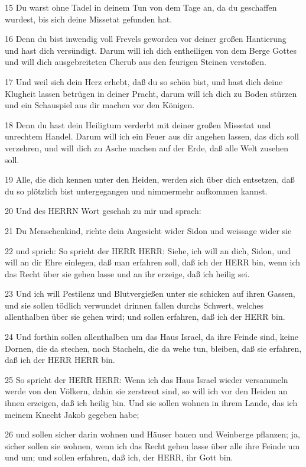 \par 15 Du warst ohne Tadel in deinem Tun von dem Tage an, da du geschaffen wurdest, bis sich deine Missetat gefunden hat.
\par 16 Denn du bist inwendig voll Frevels geworden vor deiner großen Hantierung und hast dich versündigt. Darum will ich dich entheiligen von dem Berge Gottes und will dich ausgebreiteten Cherub aus den feurigen Steinen verstoßen.
\par 17 Und weil sich dein Herz erhebt, daß du so schön bist, und hast dich deine Klugheit lassen betrügen in deiner Pracht, darum will ich dich zu Boden stürzen und ein Schauspiel aus dir machen vor den Königen.
\par 18 Denn du hast dein Heiligtum verderbt mit deiner großen Missetat und unrechtem Handel. Darum will ich ein Feuer aus dir angehen lassen, das dich soll verzehren, und will dich zu Asche machen auf der Erde, daß alle Welt zusehen soll.
\par 19 Alle, die dich kennen unter den Heiden, werden sich über dich entsetzen, daß du so plötzlich bist untergegangen und nimmermehr aufkommen kannst.
\par 20 Und des HERRN Wort geschah zu mir und sprach:
\par 21 Du Menschenkind, richte dein Angesicht wider Sidon und weissage wider sie
\par 22 und sprich: So spricht der HERR HERR: Siehe, ich will an dich, Sidon, und will an dir Ehre einlegen, daß man erfahren soll, daß ich der HERR bin, wenn ich das Recht über sie gehen lasse und an ihr erzeige, daß ich heilig sei.
\par 23 Und ich will Pestilenz und Blutvergießen unter sie schicken auf ihren Gassen, und sie sollen tödlich verwundet drinnen fallen durchs Schwert, welches allenthalben über sie gehen wird; und sollen erfahren, daß ich der HERR bin.
\par 24 Und forthin sollen allenthalben um das Haus Israel, da ihre Feinde sind, keine Dornen, die da stechen, noch Stacheln, die da wehe tun, bleiben, daß sie erfahren, daß ich der HERR HERR bin.
\par 25 So spricht der HERR HERR: Wenn ich das Haus Israel wieder versammeln werde von den Völkern, dahin sie zerstreut sind, so will ich vor den Heiden an ihnen erzeigen, daß ich heilig bin. Und sie sollen wohnen in ihrem Lande, das ich meinem Knecht Jakob gegeben habe;
\par 26 und sollen sicher darin wohnen und Häuser bauen und Weinberge pflanzen; ja, sicher sollen sie wohnen, wenn ich das Recht gehen lasse über alle ihre Feinde um und um; und sollen erfahren, daß ich, der HERR, ihr Gott bin.

